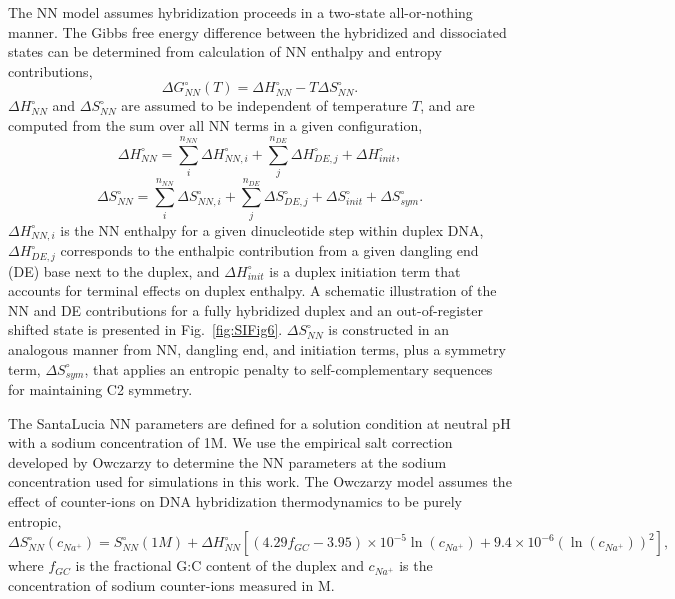 \documentclass[journal=jpcbfk,manuscript=article]{achemso}
\begin{document}
The NN model assumes hybridization proceeds in a two-state all-or-nothing manner. The Gibbs free energy difference between the hybridized and dissociated states can be determined from calculation of NN enthalpy and entropy contributions,
\begin{equation}\label{SIe1}
\Delta G_{NN}^{\circ}(T) = \Delta H_{NN}^{\circ} - T\Delta S_{NN}^{\circ}.
\end{equation}
$\Delta H_{NN}^{\circ}$ and $\Delta S_{NN}^{\circ}$ are assumed to be independent of temperature $T$, and are computed from the sum over all NN terms in a given configuration,
\begin{equation}\label{SIe2}
\Delta H_{NN}^{\circ} = \sum_{i}^{n_{NN}}\Delta H_{NN, i}^{\circ} + \sum_{j}^{n_{DE}}\Delta H_{DE, j}^{\circ} + \Delta H_{init}^{\circ},
\end{equation}
\begin{equation}\label{SIe3}
\Delta S_{NN}^{\circ} = \sum_{i}^{n_{NN}}\Delta S_{NN, i}^{\circ} + \sum_{j}^{n_{DE}}\Delta S_{DE, j}^{\circ} + \Delta S_{init}^{\circ} + \Delta S_{sym}^{\circ}.
\end{equation}                          
$\Delta H_{NN, i}^{\circ}$ is the NN enthalpy for a given dinucleotide step within duplex DNA, $\Delta H_{DE, j}^{\circ}$ corresponds to the enthalpic contribution from a given dangling end (DE) base next to the duplex\citep{Santalucia2004TheMotifs}, and $\Delta H_{init}^{\circ}$ is a duplex initiation term that accounts for terminal effects on duplex enthalpy. A schematic illustration of the NN and DE contributions for a fully hybridized duplex and an out-of-register shifted state is presented in Fig.~\ref{fig:SIFig6}. $\Delta S_{NN}^{\circ}$ is constructed in an analogous manner from NN, dangling end, and initiation terms, plus a symmetry term, $\Delta S_{sym}^{\circ}$, that applies an entropic penalty to self-complementary sequences for maintaining C2 symmetry. 

The SantaLucia NN parameters are defined for a solution condition at neutral pH with a sodium concentration of 1M. We use the empirical salt correction developed by Owczarzy\citep{Owczarzy2008PredictingCations} to determine the NN parameters at the sodium concentration used for simulations in this work. The Owczarzy model assumes the effect of counter-ions on DNA hybridization thermodynamics to be purely entropic,
\begin{equation}\label{SIe4}
\Delta S_{NN}^{\circ}(c_{Na^+}) = S_{NN}^{\circ}(1M) + \Delta H_{NN}^{\circ}[(4.29f_{GC}-3.95)\times 10^{-5} \ln{(c_{Na^+})}+ 9.4\times 10^{-6} (\ln{(c_{Na^+})})^2],
\end{equation} 
where $f_{GC}$ is the fractional G:C content of the duplex and $c_{Na^+}$ is the concentration of sodium counter-ions measured in M.  
\end{document}

